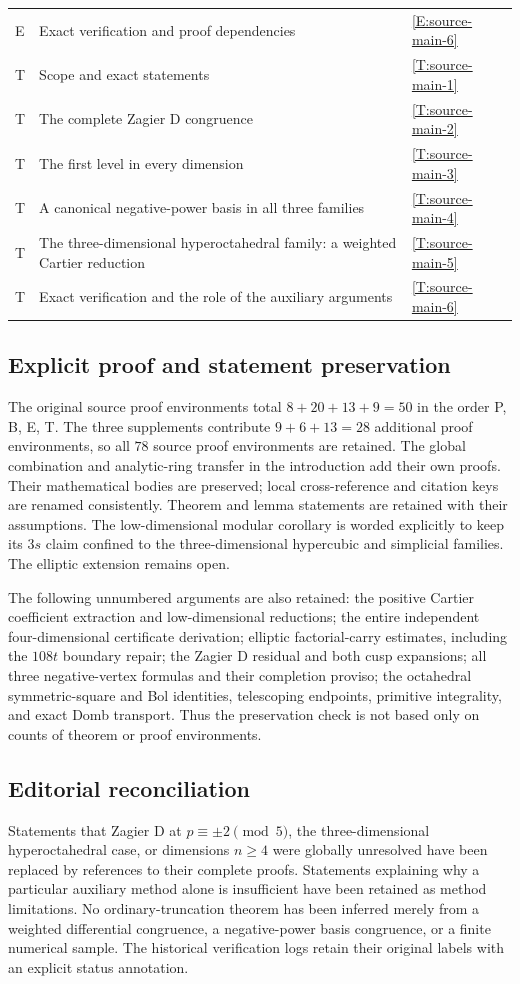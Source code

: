 \documentclass[11pt,a4paper]{article}
\theoremstyle{definition}\newtheorem{definition}[theorem]{Definition}
\theoremstyle{remark}\newtheorem{remark}[theorem]{Remark}
\numberwithin{equation}{section}
\begin{document}
\begin{longtable}{@{}p{}p{}p{}@{}}
E & Exact verification and proof dependencies & \ref{E:source-main-6}\\
T & Scope and exact statements & \ref{T:source-main-1}\\
T & The complete Zagier D congruence & \ref{T:source-main-2}\\
T & The first level in every dimension & \ref{T:source-main-3}\\
T & A canonical negative-power basis in all three families & \ref{T:source-main-4}\\
T & The three-dimensional hyperoctahedral family: a weighted Cartier reduction & \ref{T:source-main-5}\\
T & Exact verification and the role of the auxiliary arguments & \ref{T:source-main-6}\\
\bottomrule
\end{longtable}

\subsection{Explicit proof and statement preservation}
The original source proof environments total $8+20+13+9=50$ in the order P, B, E, T.
The three supplements contribute $9+6+13=28$ additional proof environments,
so all $78$ source proof environments are retained. The global
combination and analytic-ring transfer in the introduction add their own proofs. Their mathematical bodies are preserved; local cross-reference and citation keys are renamed consistently. Theorem and lemma statements are retained with their assumptions. The low-dimensional modular corollary is worded explicitly to keep its $3s$ claim confined to the three-dimensional hypercubic and simplicial families. The elliptic extension remains open.

The following unnumbered arguments are also retained: the positive Cartier coefficient extraction and low-dimensional reductions; the entire independent four-dimensional certificate derivation; elliptic factorial-carry estimates, including the $108t$ boundary repair; the Zagier D residual and both cusp expansions; all three negative-vertex formulas and their completion proviso; the octahedral symmetric-square and Bol identities, telescoping endpoints, primitive integrality, and exact Domb transport. Thus the preservation check is not based only on counts of theorem or proof environments.

\subsection{Editorial reconciliation}
Statements that Zagier D at $p\equiv\pm2\pmod5$, the three-dimensional hyperoctahedral case, or dimensions $n\ge4$ were globally unresolved have been replaced by references to their complete proofs. Statements explaining why a particular auxiliary method alone is insufficient have been retained as method limitations. No ordinary-truncation theorem has been inferred merely from a weighted differential congruence, a negative-power basis congruence, or a finite numerical sample. The historical verification logs retain their original labels with an explicit status annotation.
\end{document}
